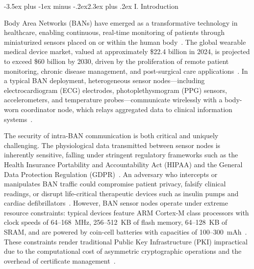 \documentclass[10pt,twocolumn]{article}
\makeatletter
\renewcommand{\section}{\@startsection{section}{1}{\z@}%
  {-3.5ex plus -1ex minus -.2ex}{2.3ex plus .2ex}%
  {\normalfont\large\bfseries\centering}}
\makeatother
\begin{document}
\section{I. Introduction}
\label{sec:introduction}

Body Area Networks (BANs) have emerged as a transformative technology in healthcare, enabling continuous, real-time monitoring of patients through miniaturized sensors placed on or within the human body~\cite{movassaghi2014wireless, cao2009enabling}. The global wearable medical device market, valued at approximately \$22.4 billion in 2024, is projected to exceed \$60 billion by 2030, driven by the proliferation of remote patient monitoring, chronic disease management, and post-surgical care applications~\cite{al2017body}. In a typical BAN deployment, heterogeneous sensor nodes---including electrocardiogram (ECG) electrodes, photoplethysmogram (PPG) sensors, accelerometers, and temperature probes---communicate wirelessly with a body-worn coordinator node, which relays aggregated data to clinical information systems~\cite{chen2011body}.

The security of intra-BAN communication is both critical and uniquely challenging. The physiological data transmitted between sensor nodes is inherently sensitive, falling under stringent regulatory frameworks such as the Health Insurance Portability and Accountability Act (HIPAA) and the General Data Protection Regulation (GDPR)~\cite{li2010data}. An adversary who intercepts or manipulates BAN traffic could compromise patient privacy, falsify clinical readings, or disrupt life-critical therapeutic devices such as insulin pumps and cardiac defibrillators~\cite{rushanan2014sok}. However, BAN sensor nodes operate under extreme resource constraints: typical devices feature ARM Cortex-M class processors with clock speeds of 64--168~MHz, 256--512~KB of flash memory, 64--128~KB of SRAM, and are powered by coin-cell batteries with capacities of 100--300~mAh~\cite{zhang2017security}. These constraints render traditional Public Key Infrastructure (PKI) impractical due to the computational cost of asymmetric cryptographic operations and the overhead of certificate management~\cite{kompara2018survey}.
\end{document}
